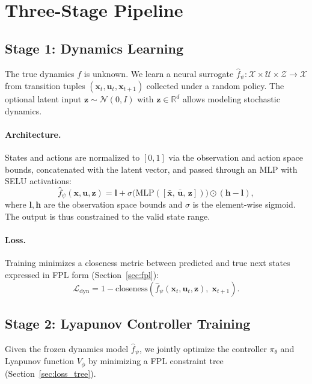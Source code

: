 \documentclass[11pt]{article}
\newcommand{\R}{\mathbb{R}}
\newcommand{\x}{\bm{x}}
\newcommand{\uu}{\bm{u}}
\theoremstyle{definition}
\begin{document}
\section{Three-Stage Pipeline}

\subsection{Stage 1: Dynamics Learning}

The true dynamics $f$ is unknown. We learn a neural surrogate
$\hat{f}_\psi : \mathcal{X} \times \mathcal{U} \times \mathcal{Z} \to \mathcal{X}$
from transition tuples $(\x_t, \uu_t, \x_{t+1})$ collected under a random
policy.  The optional latent input $\bm{z} \sim \mathcal{N}(0, I)$ with
$\bm{z} \in \R^d$ allows modeling stochastic dynamics.

\paragraph{Architecture.}
States and actions are normalized to $[0,1]$ via the observation and action
space bounds, concatenated with the latent vector, and passed through an MLP
with SELU activations:
\[
    \hat{f}_\psi(\x, \uu, \bm{z})
    = \bm{l} + \sigma\!\bigl(\text{MLP}([\bar{\x},\, \bar{\uu},\, \bm{z}])\bigr)
      \odot (\bm{h} - \bm{l}),
\]
where $\bm{l}, \bm{h}$ are the observation space bounds and $\sigma$ is the
element-wise sigmoid.  The output is thus constrained to the valid state range.

\paragraph{Loss.}
Training minimizes a closeness metric between predicted and true next states
expressed in FPL form (Section~\ref{sec:fpl}):
\[
    \mathcal{L}_{\text{dyn}} = 1 - \text{closeness}(\hat{f}_\psi(\x_t, \uu_t, \bm{z}),\; \x_{t+1}).
\]

\subsection{Stage 2: Lyapunov Controller Training}

Given the frozen dynamics model $\hat{f}_\psi$, we jointly optimize the
controller $\pi_\theta$ and Lyapunov function $V_\phi$ by minimizing
a FPL constraint tree (Section~\ref{sec:loss_tree}).
\end{document}
